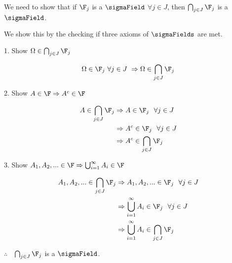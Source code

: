 \newcommand{\capFj}{\bigcap_{j\in J} \F_j}

We need to show that if $\F_j$ is a $\sigmaField$ $\forall j \in J$,
then $\capFj$ is a $\sigmaField$.

We show this by the checking if three axioms of $\sigmaFields$ are met. 

1. Show $\Omega\in\capFj$ 

$$
\Omega \in \F_j ~\forall j\in J~ \Rightarrow \Omega \in \capFj
$$

2. Show $A \in \F \Rightarrow A^c \in \F$ 

\begin{align*}
A \in \capFj &\Rightarrow A \in \F_j ~~\forall j\in J \\
&\Rightarrow A^c \in \F_j ~~\forall j\in J \\
&\Rightarrow A^c \in \capFj \\
\end{align*}

3. Show $A_1, A_2, ... \in \F \Rightarrow \bigcup_{i=1}^\infty A_i \in \F$

\begin{align*}
A_1, A_2, ... \in \capFj &\Rightarrow A_1, A_2, ... \in \F_j ~~\forall j\in J \\
&\Rightarrow \bigcup_{i=1}^\infty A_i \in \F_j ~~\forall j \in J \\
&\Rightarrow \bigcup_{i=1}^\infty A_i \in \capFj
\end{align*}

$\therefore$ $~~\capFj$ is a $\sigmaField$.
